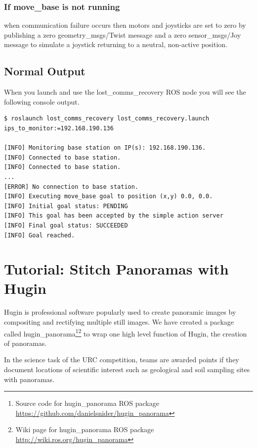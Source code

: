 \documentclass[runningheads,a4paper]{llncs}
\begin{document}
\subsubsection*{If move\_base is not running} when communication failure occurs then motors and joysticks are set to zero by publishing a zero geometry\_msgs/Twist message and a zero sensor\_msgs/Joy message to simulate a joystick returning to a neutral, non-active position.

\subsection{Normal Output}

When you launch and use the lost\_comms\_recovery ROS node you will see the following console output.

\begin{lstlisting}[frame=single,basicstyle=\ttfamily\footnotesize,breaklines=true]
$ roslaunch lost_comms_recovery lost_comms_recovery.launch ips_to_monitor:=192.168.190.136

[INFO] Monitoring base station on IP(s): 192.168.190.136.
[INFO] Connected to base station.
[INFO] Connected to base station.
...
[ERROR] No connection to base station.
[INFO] Executing move_base goal to position (x,y) 0.0, 0.0.
[INFO] Initial goal status: PENDING
[INFO] This goal has been accepted by the simple action server
[INFO] Final goal status: SUCCEEDED
[INFO] Goal reached.
\end{lstlisting}



\section{Tutorial: Stitch Panoramas with Hugin}\label{pano}

Hugin\cite{hugin} is professional software popularly used to create panoramic images by compositing and rectifying multiple still images. We have created a package called hugin\_panorama\footnote{Source code for hugin\_panorama ROS package \url{https://github.com/danielsnider/hugin_panorama}}\footnote{Wiki page for hugin\_panorama ROS package \url{http://wiki.ros.org/hugin_panorama}} to wrap one high level function of Hugin, the creation of panoramas. 

In the science task of the URC competition, teams are awarded points if they document locations of scientific interest such as geological and soil sampling sites with panoramas.
\end{document}
